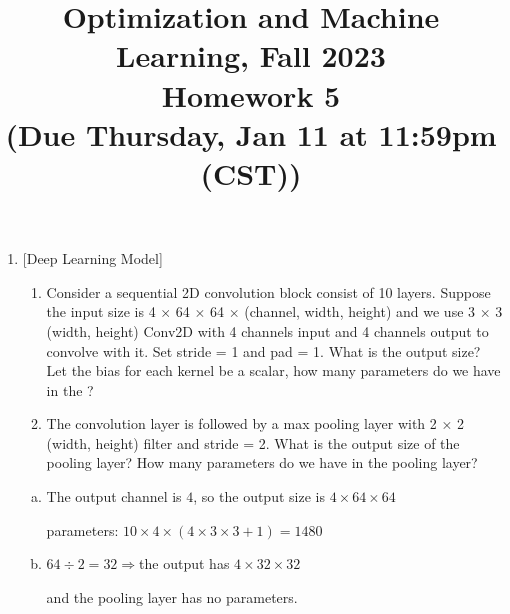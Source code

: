 \documentclass[10pt]{article}
\begin{document}
\date{}
\title{Optimization and Machine Learning, Fall 2023 \\
	Homework 5 \\
	\small (Due Thursday, Jan 11 at 11:59pm (CST))}
\maketitle
\begin{enumerate}[1.]

	\item {} [Deep Learning Model]
	\begin{enumerate}
		\item Consider a sequential 2D convolution block consist of 10 layers. Suppose the input size is 4 $\times$ 64 $\times$ 64 $\times$ (channel, width, height) and
		we use 3 $\times$ 3 (width, height) Conv2D with 4 channels input and 4 channels output to convolve with it. Set stride = 1 and pad = 1. What is the output size? Let the bias for each kernel be a scalar, how many parameters do we have in the ? 
		\item The convolution layer is followed by a max pooling layer with 2 × 2 (width, height) filter and stride
		= 2. What is the output size of the pooling layer? How many parameters do we have in the pooling
		layer? 
	\end{enumerate} 
	
	\begin{enumerate}[(a)]
		\item 
		The output channel is $4$, so the output size is $4\times64\times64$

		parameters: $10\times4\times(4\times3\times3+1)=1480$
		\item 
		$64\div2=32\Rightarrow$the output has $4\times32\times32$


		and the pooling layer has no parameters.
	\end{enumerate}
	
	\newpage



\end{enumerate}
\end{document}
